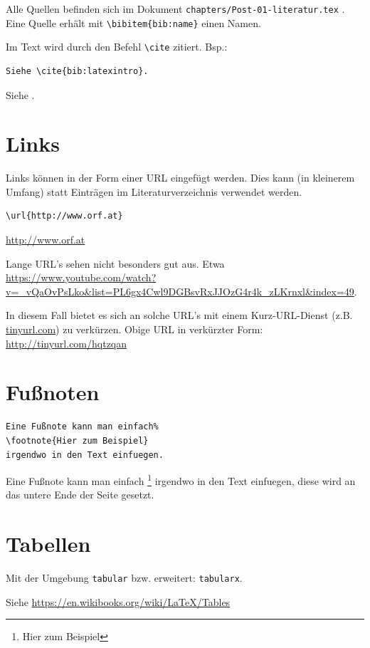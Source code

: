 Alle Quellen befinden sich im Dokument \verb+chapters/Post-01-literatur.tex+ .
Eine Quelle erhält mit \lstinline|\bibitem{bib:name}| einen Namen.

Im Text wird durch den Befehl \lstinline{\cite} zitiert.
Bsp.:

\begin{Verbatim}[frame=single]
Siehe \cite{bib:latexintro}.
\end{Verbatim}

\begin{framed}
Siehe \cite{bib:latexintro}.
\end{framed}



\section{Links}

Links können in der Form einer URL eingefügt werden.
Dies kann (in kleinerem Umfang) statt Einträgen im Literaturverzeichnis verwendet werden.

\begin{Verbatim}[frame=single]
\url{http://www.orf.at}
\end{Verbatim}
\begin{framed}
\url{http://www.orf.at}
\end{framed}

Lange URL's sehen nicht besonders gut aus. Etwa \url{https://www.youtube.com/watch?v=_vQaOvPsLko&list=PL6gx4Cwl9DGBsvRxJJOzG4r4k_zLKrnxl&index=49}.

In diesem Fall bietet es sich an solche URL's mit einem Kurz-URL-Dienst (z.B. \url{tinyurl.com}) zu verkürzen. 
Obige URL in verkürzter Form: \url{http://tinyurl.com/hqtzqan}


\section{Fußnoten}

\begin{Verbatim}[frame=single]
Eine Fußnote kann man einfach%
\footnote{Hier zum Beispiel}
irgendwo in den Text einfuegen.
\end{Verbatim}

Eine Fußnote kann man einfach%
\footnote{Hier zum Beispiel}
irgendwo in den Text einfuegen, diese wird an das untere Ende der Seite gesetzt.


\section{Tabellen}

Mit der Umgebung \lstinline{tabular} bzw. erweitert: \lstinline{tabularx}.

Siehe \url{https://en.wikibooks.org/wiki/LaTeX/Tables}



